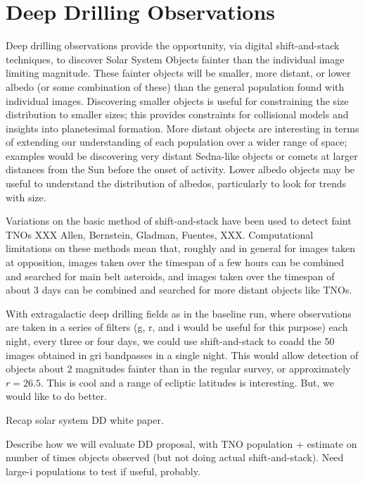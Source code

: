 \section{Deep Drilling Observations}
\def\secname{\chpname:dd}\label{sec:\secname}

Deep drilling observations provide the opportunity, via digital
shift-and-stack techniques, to discover Solar System Objects fainter
than the individual image limiting magnitude. These fainter objects
will be smaller, more distant, or lower albedo (or some combination of these)
than the general population found with individual images. Discovering smaller
objects is useful for constraining the size distribution to smaller
sizes; this provides constraints for collisional models and insights
into planetesimal formation. More distant objects are interesting in
terms of extending our understanding of each population over a wider
range of space; examples would be discovering very distant
Sedna-like objects or comets at larger distances from the Sun before
the onset of activity. Lower albedo objects may be useful to
understand the distribution of albedos, particularly to look for
trends with size.

Variations on the basic method of shift-and-stack have been used to
detect faint TNOs XXX Allen, Bernstein, Gladman, Fuentes, 
XXX. Computational limitations on these methods mean that, roughly
and in general for images taken at opposition, images taken over the
timespan of a few hours can be
combined and searched for main belt asteroids, and images taken over
the timespan of about 3 days can be combined and searched for more
distant objects like TNOs.

With extragalactic deep drilling fields as in the baseline 
run, where observations are taken in a series of filters (g, r, and i
would be useful for this purpose) each night, every three or four
days, we could use shift-and-stack to coadd the 50 images obtained in
gri bandpasses in a single night. This would allow detection of
objects about 2 magnitudes fainter than in the regular survey, or
approximately $r=26.5$.  This is cool and a range of ecliptic
latitudes is interesting.  But, we would like to do better.

Recap solar system DD white paper.

Describe how we will evaluate DD proposal, with TNO population +
estimate on number of times objects observed (but not doing actual
shift-and-stack). Need large-i populations to test if useful, probably.


\navigationbar

